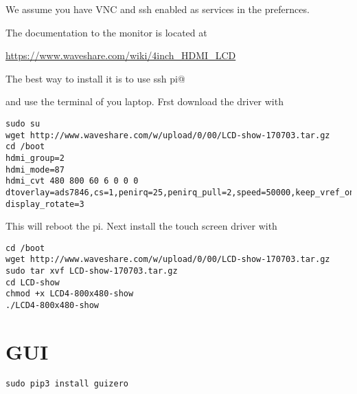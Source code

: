 We assume you have VNC and ssh enabled as services in the prefernces.

The documentation to the monitor is located at

\url{https://www.waveshare.com/wiki/4inch_HDMI_LCD}

The best way to install it is to use ssh pi@

and use the terminal of you laptop. Frst download the driver with

\begin{lstlisting}
sudo su
wget http://www.waveshare.com/w/upload/0/00/LCD-show-170703.tar.gz
cd /boot
hdmi_group=2
hdmi_mode=87
hdmi_cvt 480 800 60 6 0 0 0
dtoverlay=ads7846,cs=1,penirq=25,penirq_pull=2,speed=50000,keep_vref_on=0,swapxy=0,pmax=255,xohms=150,xmin=200,xmax=3900,ymin=200,ymax=3900
display_rotate=3
\end{lstlisting}

This will reboot the pi. Next install the touch screen driver with

\begin{lstlisting}
cd /boot
wget http://www.waveshare.com/w/upload/0/00/LCD-show-170703.tar.gz
sudo tar xvf LCD-show-170703.tar.gz 
cd LCD-show
chmod +x LCD4-800x480-show
./LCD4-800x480-show
\end{lstlisting}

\section{GUI}

\begin{lstlisting}
sudo pip3 install guizero
\end{lstlisting}

